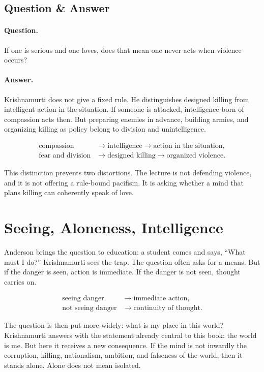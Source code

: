 \documentclass[11pt,oneside]{book}
\begin{document}
\subsection{Question \& Answer}

\paragraph{Question.}
If one is serious and one loves, does that mean one never acts when violence occurs?

\paragraph{Answer.}
Krishnamurti does not give a fixed rule. He distinguishes designed killing from intelligent action in the situation. If someone is attacked, intelligence born of compassion acts then. But preparing enemies in advance, building armies, and organizing killing as policy belong to division and unintelligence.

\begin{align}
\text{compassion} &\longrightarrow \text{intelligence}
\longrightarrow \text{action in the situation},\\
\text{fear and division} &\longrightarrow \text{designed killing}
\longrightarrow \text{organized violence}.
\end{align}

This distinction prevents two distortions. The lecture is not defending violence, and it is not offering a rule-bound pacifism. It is asking whether a mind that plans killing can coherently speak of love.

\section{Seeing, Aloneness, Intelligence}

Anderson brings the question to education: a student comes and says, ``What must I do?'' Krishnamurti sees the trap. The question often asks for a means. But if the danger is seen, action is immediate. If the danger is not seen, thought carries on.

\begin{align}
\text{seeing danger} &\longrightarrow \text{immediate action},\\
\text{not seeing danger} &\longrightarrow \text{continuity of thought}.
\end{align}

The question is then put more widely: what is my place in this world? Krishnamurti answers with the statement already central to this book: the world is me. But here it receives a new consequence. If the mind is not inwardly the corruption, killing, nationalism, ambition, and falseness of the world, then it stands alone. Alone does not mean isolated.
\end{document}
